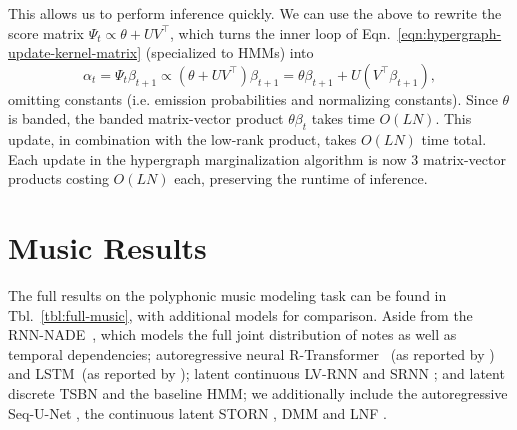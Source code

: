 \documentclass{article}
\begin{document}
This allows us to perform inference quickly.
We can use the above to rewrite the score matrix $\Psi_t \propto \theta + UV^\top$, which turns the inner loop of Eqn.~\ref{eqn:hypergraph-update-kernel-matrix} (specialized to HMMs) into
\begin{equation}
    \label{eqn:hmm-band-update}
    \alpha_t = \Psi_t\beta_{t+1} \propto (\theta + UV^\top)\beta_{t+1} = \theta\beta_{t+1} + U(V^\top \beta_{t+1}),
\end{equation}
omitting constants (i.e. emission probabilities and normalizing constants).
Since $\theta$ is banded, the banded matrix-vector product $\theta\beta_t$ takes time $O(LN)$.
This update, in combination with the low-rank product, takes $O(LN)$ time total. Each update in the hypergraph marginalization algorithm is now 3 matrix-vector products costing $O(LN)$ each, preserving the runtime of inference.

\section{Music Results}
\label{sec:full-music}
The full results on the polyphonic music modeling task can be found in Tbl.~\ref{tbl:full-music}, with additional models for comparison.
Aside from the RNN-NADE~\citep{polyphonic}, which models the full joint distribution of notes as well as temporal dependencies;  autoregressive neural R-Transformer~\citep{rtransformer} (as reported by \citet{betalstm}) and LSTM~(as reported by \citet{flow}); latent continuous LV-RNN \citep{nasmc} and SRNN \citep{srnn}; and latent discrete TSBN \citep{tsbn} and the baseline HMM; we additionally include the autoregressive Seq-U-Net \citet{sequnet}, the continuous latent STORN \citep{storn}, DMM \citep{dmm} and LNF \citep{flow}.
\end{document}

